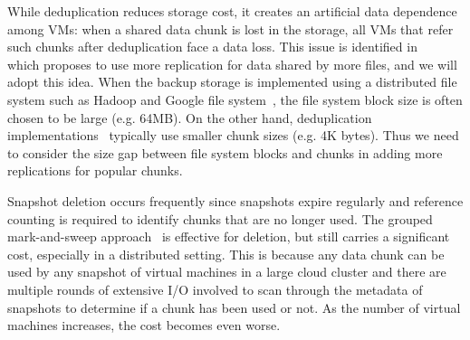 
While deduplication reduces storage cost, it creates an artificial data dependence among VMs: when a shared data chunk
is lost in the storage, all VMs that refer such chunks after deduplication face a data loss.
This issue is identified in ~\cite{Reliability06} which proposes to use more replication for data shared by more files,
and we will adopt this idea.
When the backup storage is implemented using a distributed file system such as Hadoop and Google file system~\cite{googlefs03},  
the file system block  size is often chosen to be large (e.g. 64MB). On the other hand, 
deduplication implementations~\cite{Guo2011,extreme_binning09,bottleneck08,Jin2009,Dong2011}
 typically use smaller chunk sizes (e.g. 4K bytes).
Thus we need to consider the size gap between file system blocks and chunks  in adding more replications for popular chunks. 

 
Snapshot deletion occurs frequently since  snapshots expire regularly
and reference counting is required to identify chunks that are no longer used.
The grouped mark-and-sweep approach~\cite{Guo2011}
is effective for deletion, but still carries a significant cost, especially in a distributed 
setting.   This is because any data chunk can be used by any snapshot
of virtual machines in a large cloud cluster and there are multiple rounds of  extensive I/O involved
to scan through the metadata of snapshots to determine if a chunk has been used or not.
As the number of virtual  machines increases, the cost becomes even worse.


